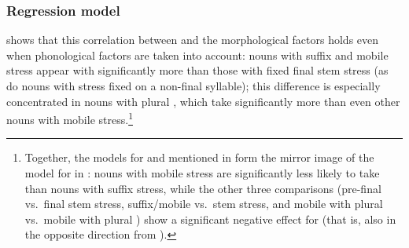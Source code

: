 \documentclass[output=paper,colorlinks,citecolor=brown
]{langscibook}
\begin{document}
\subsubsection{Regression model}
 shows that this correlation between \ok{} and the morphological factors holds even when phonological factors are taken into account: nouns with suffix and mobile stress appear with \ok{} significantly more than those with fixed final stem stress (as do nouns with stress fixed on a non-final syllable); this difference is especially concentrated in nouns with plural \pla, which take \ok{} significantly more than even other nouns with mobile stress.\footnote{Together, the models for \ik{} and \chik{} mentioned in  form the mirror image of the model for \ok{} in : nouns with mobile stress are significantly less likely to take \ik{} than nouns with suffix stress, while the other three comparisons (pre-final vs.\ final stem stress, suffix/mobile vs.\ stem stress, and mobile with plural \pla{} vs.\ mobile with plural \pli{}) show a significant negative effect for \chik{} (that is, also in the opposite direction from \ok{}).}
\end{document}
